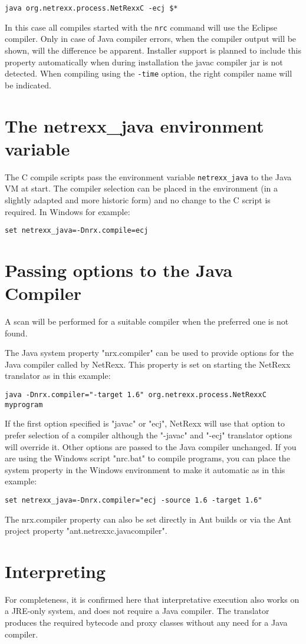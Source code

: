 \begin{verbatim}
java org.netrexx.process.NetRexxC -ecj $*
\end{verbatim}
 
In this case all compiles started with the \texttt{nrc} command will use the Eclipse compiler. Only in case of Java compiler errors, when the compiler output will be shown, will the difference be apparent. Installer support is planned to include this property automatically when during \nr{} installation the javac compiler jar is not detected. When compiling using the \texttt{-time} option, the right compiler name will be indicated.
\section{The netrexx\_java environment variable}
The \nr{}C compile scripts pass the environment variable \texttt{netrexx\_java} to the Java VM at start. The compiler selection can be placed in the environment (in a slightly adapted and more historic form) and no change to the \nr{}C script is required. In Windows for example:
\begin{verbatim}
set netrexx_java=-Dnrx.compile=ecj
\end{verbatim}

\section{Passing options to the Java Compiler}
A scan will be performed for a suitable compiler when the preferred one is not found. 

The Java system property "nrx.compiler" can be used to provide options for the Java compiler called by NetRexx. This property is set on starting the NetRexx translator as in this example:
\begin{verbatim}
java -Dnrx.compiler="-target 1.6" org.netrexx.process.NetRexxC myprogram
\end{verbatim}
If the first option specified is "javac" or "ecj", NetRexx will use that option to prefer selection of a compiler although the "-javac" and "-ecj" translator options will override it. Other options are passed to the Java compiler unchanged. If you are using the Windows script "nrc.bat" to compile programs, you can place the system property in the Windows environment to make it automatic as in this example:
\begin{verbatim}
set netrexx_java=-Dnrx.compiler="ecj -source 1.6 -target 1.6"
\end{verbatim}
The nrx.compiler property can also be set directly in Ant builds or via the Ant project property "ant.netrexxc.javacompiler".

\section{Interpreting}
For completeness, it is confirmed here that interpretative execution also works on a JRE-only system, and does not require a Java compiler. The \nr{} translator produces the required bytecode and proxy classes without any need for a Java compiler.
 